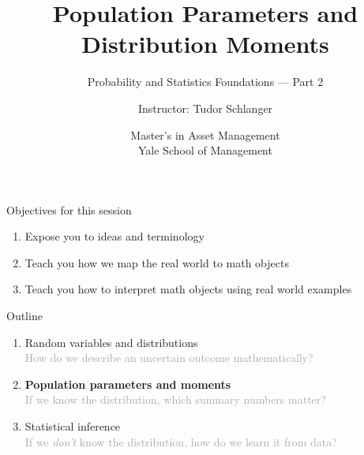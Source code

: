 \documentclass[9pt,english,aspectratio=169]{beamer}
\title{\textbf{Population Parameters and Distribution Moments}}
\subtitle{Probability and Statistics Foundations --- Part 2}
\author{Instructor: Tudor Schlanger}
\date{Master's in Asset Management \\ Yale School of Management}
\begin{document}
\begin{frame}
  \titlepage
\end{frame}

\begin{frame}{Objectives for this session}
  \large
  \begin{enumerate}
    \item Expose you to ideas and terminology \\[1em]
    \item Teach you how we map the real world to math objects \\[1em]
    \item Teach you how to interpret math objects using real world examples
  \end{enumerate}

\end{frame}


\begin{frame}{Outline}

  \vspace{0.8em}
  \large
  \begin{enumerate}
    \item[\textbf{1.}] Random variables and distributions \\
          {\small\textcolor{DarkGray}{How do we describe an uncertain outcome mathematically?}}
          \vspace{0.5em}
    \item[\textbf{2.}] \textbf{Population parameters and moments} \\
          {\small\textcolor{DarkGray}{If we know the distribution, which summary numbers matter?}}
          \vspace{0.5em}
    \item[\textbf{3.}] Statistical inference \\
          {\small\textcolor{DarkGray}{If we \emph{don't} know the distribution, how do we learn it from data?}}
  \end{enumerate}

\end{frame}


\end{document}
